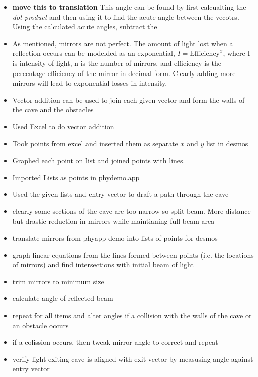 \documentclass[11pt, letterpaper]{article}
\begin{document}
\begin{itemize}

\item  \textbf{move this to translation} This angle can be found by first calcualting the \textit{dot product} and then using it to find the acute angle between the vecotrs. Using the calculated acute angles, subtract the 	

\item	As mentioned, mirrors are not perfect. The amount of light lost when a reflection occurs can be modelded as an exponential, $I=\textrm{Efficiency}^x$, where I is intensity of light, n is the number of mirrors, and efficiency is the percentage efficiency of the mirror in decimal form. Clearly  adding more mirrors will lead to exponential losses in intensity.

\item Vector addition can be used to join each given vector and form the walls of the cave and the obstacles

\item Used Excel to do vector addition

\item Took points from excel and inserted them as separate $x$ and $y$ list in desmos

\item Graphed each point on list and joined points with lines.

\item Imported Lists as points in phydemo.app

\item Used the given lists and entry vector to draft a path through the cave

\item  clearly some sections of the cave are too narrow so split beam. More distance but drastic reduction in mirrors while maintianing full beam area

\item translate mirrors from phyapp demo into lists of points for desmos

\item graph linear equations from the lines formed between points (i.e. the locations of mirrors) and find intersections with initial beam of light

\item  trim mirrors to minimum size

\item calculate angle of reflected beam 

\item repeat for all items and alter angles if a collision with the walls of the cave or an obstacle occurs

\item if a colission occurs, then tweak mirror angle to correct and repeat

\item verify light exiting cave is aligned with exit vector by measusing angle against entry vector
\end{itemize}
\end{document}
